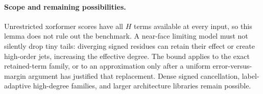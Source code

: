 \documentclass{article}
\begin{document}
\paragraph{Scope and remaining possibilities.}
Unrestricted xorformer scores have all $H$ terms available at every input,
so this lemma does not rule out the benchmark. A near-face limiting model
must not silently drop tiny tails: diverging signed residues can retain
their effect or create high-order jets, increasing the effective degree.
The bound applies to the exact retained-term family, or to an approximation
only after a uniform error-versus-margin argument has justified that
replacement. Dense signed cancellation, label-adaptive high-degree
families, and larger architecture libraries remain possible.
\end{document}
